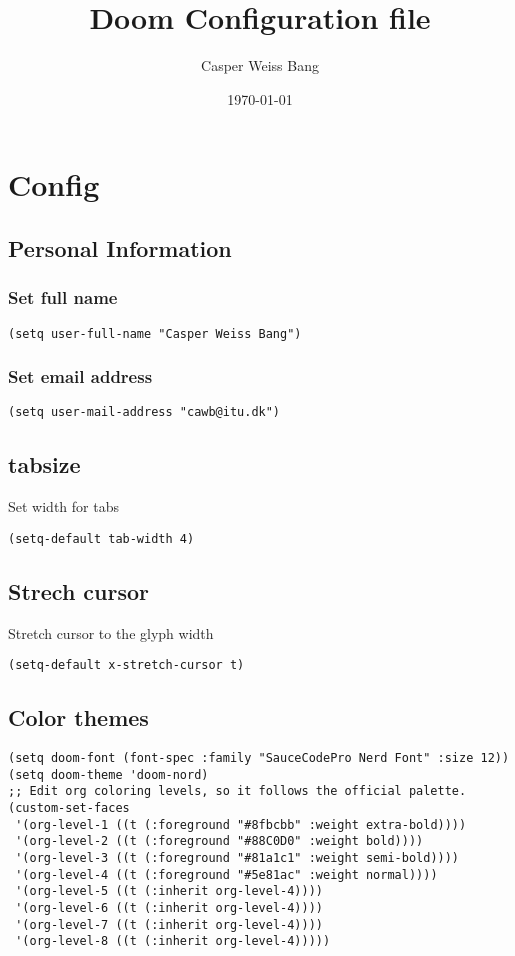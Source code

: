 \documentclass[11pt]{article}
\author{Casper Weiss Bang}
\date{\today}
\title{Doom Configuration file}
\begin{document}
\maketitle
\tableofcontents \clearpage\section{Config}
\label{sec:orgbbf6409}
\subsection{Personal Information}
\label{sec:orgd475704}
\subsubsection{Set full name}
\label{sec:org8861453}
\begin{verbatim}
(setq user-full-name "Casper Weiss Bang")
\end{verbatim}
\subsubsection{Set email address}
\label{sec:org9a32edf}
\begin{verbatim}
(setq user-mail-address "cawb@itu.dk")
\end{verbatim}
\subsection{tabsize}
\label{sec:org50c17c9}
Set width for tabs
\begin{verbatim}
(setq-default tab-width 4)
\end{verbatim}
\subsection{Strech cursor}
\label{sec:org1c0a2e5}
Stretch cursor to the glyph width
\begin{verbatim}
(setq-default x-stretch-cursor t)
\end{verbatim}
\subsection{Color themes}
\label{sec:org670b6e7}
\begin{verbatim}
(setq doom-font (font-spec :family "SauceCodePro Nerd Font" :size 12))
(setq doom-theme 'doom-nord)
;; Edit org coloring levels, so it follows the official palette.
(custom-set-faces
 '(org-level-1 ((t (:foreground "#8fbcbb" :weight extra-bold))))
 '(org-level-2 ((t (:foreground "#88C0D0" :weight bold))))
 '(org-level-3 ((t (:foreground "#81a1c1" :weight semi-bold))))
 '(org-level-4 ((t (:foreground "#5e81ac" :weight normal))))
 '(org-level-5 ((t (:inherit org-level-4))))
 '(org-level-6 ((t (:inherit org-level-4))))
 '(org-level-7 ((t (:inherit org-level-4))))
 '(org-level-8 ((t (:inherit org-level-4)))))

\end{verbatim}
\end{document}
